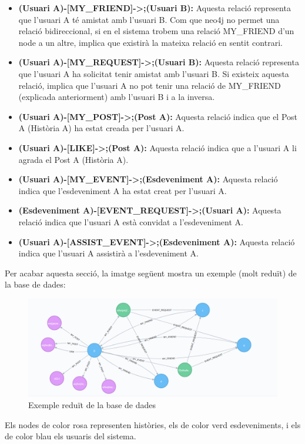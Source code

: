 \documentclass[11pt,catalan,listoffigures,listoftables]{tfgetsinf}
\begin{document}
\begin{itemize}
\item \textbf{(Usuari A)-[MY\_FRIEND]->;(Usuari B):} Aquesta relació representa que l'usuari A té amistat amb l'usuari B. Com que neo4j no permet una relació bidireccional, si en el sistema trobem una relació MY\_FRIEND d'un node a un altre, implica que existirà la mateixa relació en sentit contrari.
\item \textbf{(Usuari A)-[MY\_REQUEST]->;(Usuari B):} Aquesta relació representa que l'usuari A ha solicitat tenir amistat amb l'usuari B. Si existeix aquesta relació, implica que l'usuari A no pot tenir una relació de MY\_FRIEND (explicada anteriorment) amb l'usuari B i a la inversa.
\item \textbf{(Usuari A)-[MY\_POST]->;(Post A):} Aquesta relació indica que el Post A (Història A) ha estat creada per l'usuari A.
\item \textbf{(Usuari A)-[LIKE]->;(Post A):} Aquesta relació indica que a l'usuari A li agrada el Post A (Història A).
\item \textbf{(Usuari A)-[MY\_EVENT]->;(Esdeveniment A):} Aquesta relació indica que l'esdeveniment A ha estat creat per l'usuari A.
\item \textbf{(Esdeveniment A)-[EVENT\_REQUEST]->;(Usuari A):} Aquesta relació indica que l'usuari A està convidat a l'esdeveniment A.
\item \textbf{(Usuari A)-[ASSIST\_EVENT]->;(Esdeveniment A):} Aquesta relació indica que l'usuari A assistirà a l'esdeveniment A.
\end{itemize}
\newpage
\noindent Per acabar aquesta secció, la imatge següent mostra un exemple (molt reduït) de la base de dades:

\begin{figure}[H]
\includegraphics[width=15cm]{images/image11}
\centering
\caption[Figura 4.7]{Exemple reduït de la base de dades}
\centering
\end{figure}
\noindent Els nodes de color rosa representen històries, els de color verd esdeveniments, i els de color blau els usuaris del sistema.
\end{document}
